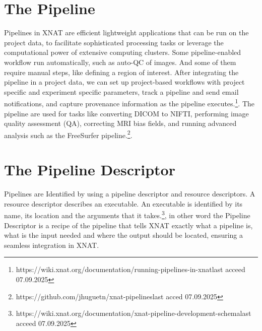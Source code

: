 \section{The Pipeline}
Pipelines in XNAT are efficient lightweight applications that can be run on the project data, to facilitate sophisticated processing tasks or leverage the computational power of extensive computing clusters. Some pipeline-enabled workflow run automatically, such as auto-QC of images. And some of them require manual steps, like defining a region of interest. After integrating the pipeline in a project data, we can set up project-based workflows with project specific and experiment specific parameters, track a pipeline and send email notifications, and capture provenance information as the pipeline executes.\footnote{https://wiki.xnat.org/documentation/running-pipelines-in-xnat{last acceed 07.09.2025}}. The pipeline are used for tasks like converting DICOM to NIFTI, performing image quality assessment (QA), correcting MRI bias fields, and running advanced analysis such as the FreeSurfer pipeline.\footnote{https://github.com/jhuguetn/xnat-pipelines{last acced 07.09.2025}}.

\section{The Pipeline Descriptor}

Pipelines are Identified by using a pipeline descriptor and resource descriptors. A resource descriptor describes an executable. An executable is identified by its name, its location and the arguments that it takes.\footnote{https://wiki.xnat.org/documentation/xnat-pipeline-development-schema{last acceed 07.09.2025}}, in other word the Pipeline Descriptor is a recipe of the pipeline that tells XNAT exactly what a pipeline is, what is the input needed and where the output should be located, ensuring a seamless integration in XNAT.







